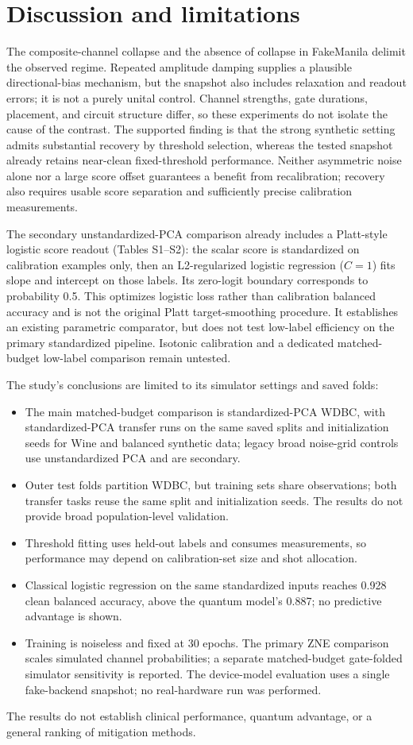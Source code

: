 \documentclass[conference]{IEEEtran}
\begin{document}
\section{Discussion and limitations}
The composite-channel collapse and the absence of collapse in FakeManila delimit the observed regime. Repeated amplitude damping supplies a plausible directional-bias mechanism, but the snapshot also includes relaxation and readout errors; it is not a purely unital control. Channel strengths, gate durations, placement, and circuit structure differ, so these experiments do not isolate the cause of the contrast. The supported finding is that the strong synthetic setting admits substantial recovery by threshold selection, whereas the tested snapshot already retains near-clean fixed-threshold performance. Neither asymmetric noise alone nor a large score offset guarantees a benefit from recalibration; recovery also requires usable score separation and sufficiently precise calibration measurements.

The secondary unstandardized-PCA comparison already includes a Platt-style logistic score readout (Tables S1--S2): the scalar score is standardized on calibration examples only, then an L2-regularized logistic regression ($C=1$) fits slope and intercept on those labels. Its zero-logit boundary corresponds to probability 0.5. This optimizes logistic loss rather than calibration balanced accuracy and is not the original Platt target-smoothing procedure. It establishes an existing parametric comparator, but does not test low-label efficiency on the primary standardized pipeline. Isotonic calibration and a dedicated matched-budget low-label comparison remain untested.

The study's conclusions are limited to its simulator settings and saved folds:
\begin{itemize}
\item The main matched-budget comparison is standardized-PCA WDBC, with standardized-PCA transfer runs on the same saved splits and initialization seeds for Wine and balanced synthetic data; legacy broad noise-grid controls use unstandardized PCA and are secondary.
\item Outer test folds partition WDBC, but training sets share observations; both transfer tasks reuse the same split and initialization seeds. The results do not provide broad population-level validation.
\item Threshold fitting uses held-out labels and consumes measurements, so performance may depend on calibration-set size and shot allocation.
\item Classical logistic regression on the same standardized inputs reaches 0.928 clean balanced accuracy, above the quantum model's 0.887; no predictive advantage is shown.
\item Training is noiseless and fixed at 30 epochs. The primary ZNE comparison scales simulated channel probabilities; a separate matched-budget gate-folded simulator sensitivity is reported. The device-model evaluation uses a single fake-backend snapshot; no real-hardware run was performed.
\end{itemize}
The results do not establish clinical performance, quantum advantage, or a general ranking of mitigation methods.
\end{document}
